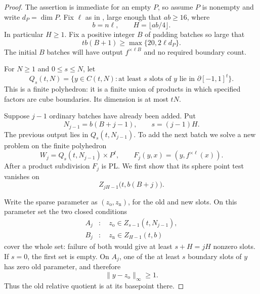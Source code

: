 \begin{proof}
The assertion is immediate for an empty $P$, so assume $P$ is
nonempty and write $d_P=\dim P$.  Fix $\ell$ as in
, large enough that $ab\ge16$, where
\[
 b=n\ell,\qquad H=\lfloor ab/4\rfloor.
\]
In particular $H\ge1$.  Fix a positive integer $B$ of padding batches
so large that
\begin{equation}
 \label{eq:padding-choice}
 tb(B+1)\ge \max\{20,2\ell d_P\}.
\end{equation}
The initial $B$ batches will have output $f^{\times\ell B}$ and no
required boundary count.

For $N\ge1$ and $0\le s\le N$, let
\[
 Q_s(t,N)=\{y\in C(t,N):
       \text{at least $s$ slots of $y$ lie in $\partial[-1,1]^t$}\}.
\]
This is a finite polyhedron: it is a finite union of products in
which specified factors are cube boundaries.  Its dimension is at
most $tN$.

Suppose $j-1$ ordinary batches have already been added.  Put
\[
 N_{j-1}=b(B+j-1),\qquad s=(j-1)H.
\]
The previous output lies in $Q_s(t,N_{j-1})$.  To add the next batch
we solve a new problem on the finite polyhedron
\begin{equation}
 \label{eq:padding-domain}
 W_j=Q_s(t,N_{j-1})\times P^\ell,
 \qquad F_j(y,x)=(y,f^{\times\ell}(x)).
\end{equation}
After a product subdivision $F_j$ is PL.  We first show that its
sphere point test vanishes on
\[
 Z_{jH-1}\bigl(t,b(B+j)\bigr).
\]

Write the sparse parameter as $(z_{\mathrm o},z_{\mathrm n})$, for
the old and new slots.  On this parameter set the two closed conditions
\begin{align*}
 A_j&:\quad z_{\mathrm o}\in Z_{s-1}(t,N_{j-1}),\\
 B_j&:\quad z_{\mathrm n}\in Z_{H-1}(t,b)
\end{align*}
cover the whole set: failure of both would give at least $s+H=jH$
nonzero slots.  If $s=0$, the first set is empty.  On $A_j$, one of
the at least $s$ boundary slots of $y$ has zero old parameter, and
therefore
\begin{equation}
 \label{eq:old-test-basepoint}
 \|y-z_{\mathrm o}\|_\infty\ge1.
\end{equation}
Thus the old relative quotient is at its basepoint there.


\end{proof}
